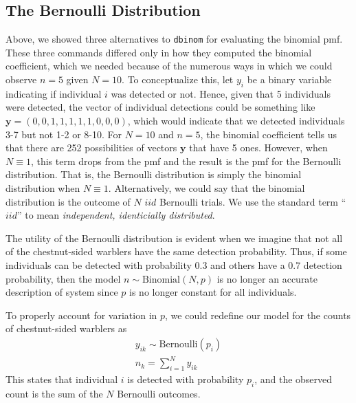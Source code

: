 \subsection{The Bernoulli Distribution}


Above, we showed three alternatives to \verb+dbinom+ for evaluating the
binomial pmf. These three commands differed only in how they computed
the binomial coefficient, which we needed because of the numerous ways
in which we could observe $n=5$ given $N=10$. To conceptualize
this, let $y_i$ be a binary variable indicating if individual $i$
was detected or not. Hence, given that 5 individuals were detected,
the vector of individual detections could be something like
$\mathbf{y}=(0,0,1,1,1,1,1,0,0,0)$, which would indicate
that we detected individuals 3-7 but not 1-2 or 8-10. For $N=10$ and
$n=5$, the binomial coefficient tells us that there
are 252 possibilities of vectors $\mathbf{y}$ that have 5 ones. However, when $N \equiv 1$, this term
drops from the pmf and the result is the pmf for the Bernoulli
distribution. That is, the Bernoulli distribution is simply the
binomial distribution when $N \equiv 1$. Alternatively, we could say that the binomial
distribution is the outcome of $N$ $iid$ Bernoulli trials. We use the
standard term ``$iid$'' to mean {\it independent, identicially distributed}.

The utility of the Bernoulli distribution is evident when we imagine
that not all of the chestnut-sided warblers have the same detection
probability. Thus, if some individuals can be detected with
probability 0.3 and others have a 0.7 detection probability, then the
model $n \sim \text{Binomial}(N, p)$ is no longer an accurate
description of system since $p$ is no
longer constant for all individuals. %


To properly account for variation in $p$, we could redefine our model
for the %
counts of chestnut-sided warblers as
\begin{gather}
y_{ik} \sim \text{Bernoulli}(p_i) \nonumber \\%
n_k = \sum_{i=1}^N y_{ik}
\label{modeling.eq.Bern}
\end{gather}
This  states that individual $i$ is detected with probability
$p_i$, and the observed count is the sum of the $N$ Bernoulli
outcomes.

